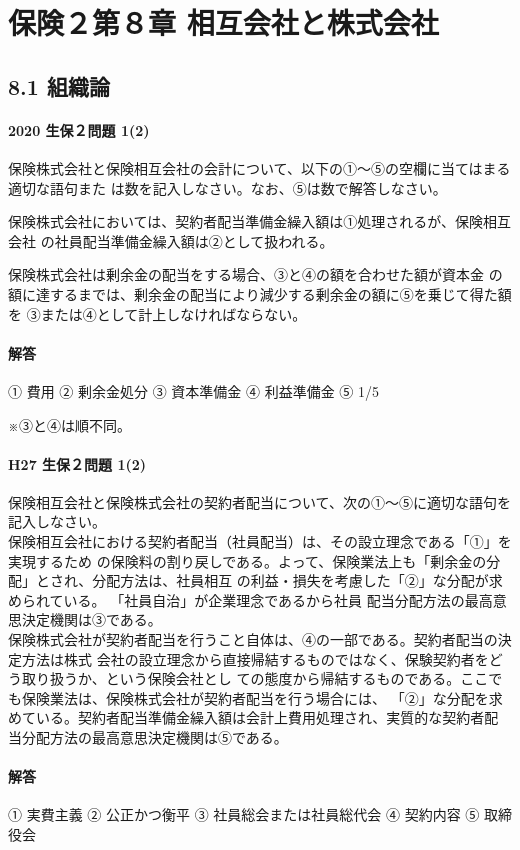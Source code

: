 \documentclass[report,gutter=10mm,fore-edge=10mm,uplatex,dvipdfmx]{jlreq}
\begin{document}
\chapter{保険２第８章 相互会社と株式会社}
\section{8.1 組織論}
\subsubsection{2020 生保２問題 1(2)}
保険株式会社と保険相互会社の会計について、以下の①～⑤の空欄に当てはまる適切な語句また
は数を記入しなさい。なお、⑤は数で解答しなさい。

保険株式会社においては、契約者配当準備金繰入額は①処理されるが、保険相互会社
の社員配当準備金繰入額は②として扱われる。

保険株式会社は剰余金の配当をする場合、③と④の額を合わせた額が資本金
の額に達するまでは、剰余金の配当により減少する剰余金の額に⑤を乗じて得た額を
③または④として計上しなければならない。
\subsubsection{解答}
① 費用  ② 剰余金処分  ③ 資本準備金  ④ 利益準備金  ⑤ 1/5

※③と④は順不同。
\subsubsection{H27 生保２問題 1(2)}
保険相互会社と保険株式会社の契約者配当について、次の①～⑤に適切な語句を記入しなさい。\\
保険相互会社における契約者配当（社員配当）は、その設立理念である「①」を実現するため
の保険料の割り戻しである。よって、保険業法上も「剰余金の分配」とされ、分配方法は、社員相互
の利益・損失を考慮した「②」な分配が求められている。
「社員自治」が企業理念であるから社員
配当分配方法の最高意思決定機関は③である。\\
保険株式会社が契約者配当を行うこと自体は、④の一部である。契約者配当の決定方法は株式
会社の設立理念から直接帰結するものではなく、保験契約者をどう取り扱うか、という保険会社とし
ての態度から帰結するものである。ここでも保険業法は、保険株式会社が契約者配当を行う場合には、
「②」な分配を求めている。契約者配当準備金繰入額は会計上費用処理され、実質的な契約者配
当分配方法の最高意思決定機関は⑤である。
\subsubsection{解答}
① 実費主義 
② 公正かつ衡平 
③ 社員総会または社員総代会 
④ 契約内容 
⑤ 取締役会
\end{document}
